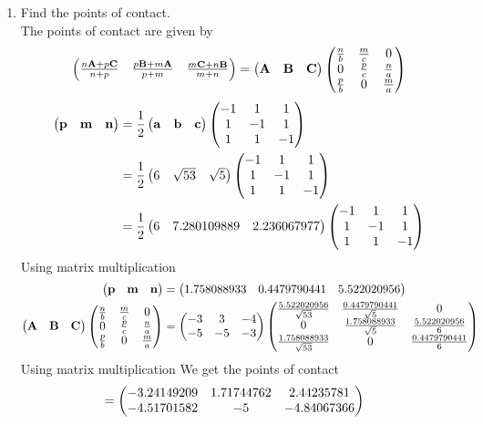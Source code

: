 \documentclass[11pt]{book}
\begin{document}
\begin{enumerate}[label=\thesubsection.\arabic*.,ref=\thesubsection.\theenumi]
\item Find the points of contact. \\ 
\solution The points of contact are given by 
\begin{align}
\begin{pmatrix}			\frac{n\mathbf{A}+p\mathbf{C}}{n+p}
&
\frac{p\mathbf{B}+m\mathbf{A}}{p+m}
&
\frac{m\mathbf{C}+n\mathbf{B}}{m+n}
\end{pmatrix}
= 	\begin{pmatrix}\mathbf{A} & \mathbf{B} &\mathbf{C}\end{pmatrix}\begin{pmatrix}\frac{n}{b} & \frac{m}{c} & 0\\0 & \frac{p}{c} & \frac{n}{a} \\\frac{p}{b} & 0 & \frac{m}{a}\end{pmatrix}
\end{align}
\begin{align}
    \begin{pmatrix}\mathbf{p} & \mathbf{ m} & \mathbf{n} \end{pmatrix} &=\frac{1}{2} \begin{pmatrix}\mathbf{a} & \mathbf{b} & \mathbf{c}\end{pmatrix} \begin{pmatrix} -1 & 1 & 1 \\1 & -1 & 1 \\1 & 1 & -1 \end{pmatrix} \\
   &= \frac{1}{2}\begin{pmatrix} 6&  \sqrt{53} & \sqrt{5} \end{pmatrix}\begin{pmatrix} -1 & 1 & 1 \\1 & -1 & 1 \\1 & 1 & -1 \end{pmatrix}  \\
   &= \frac{1}{2}\begin{pmatrix} 6&  7.280109889 & 2.236067977 \end{pmatrix}\begin{pmatrix} -1 & 1 & 1 \\1 & -1 & 1 \\1 & 1 & -1 \end{pmatrix}
\end{align}
Using matrix multiplication 
\begin{align}
        \begin{pmatrix}\mathbf{p} & \mathbf{ m} & \mathbf{n} \end{pmatrix} &= \begin{pmatrix} 1.758088933 &  0.4479790441& 5.522020956 \end{pmatrix}   \\
\begin{pmatrix}\mathbf{A} & \mathbf{B} &\mathbf{C}\end{pmatrix}\begin{pmatrix}\frac{n}{b} & \frac{m}{c} & 0\\0 & \frac{p}{c} & \frac{n}{a} \\\frac{p}{b} & 0 & \frac{m}{a}\end{pmatrix} 
  &= \begin{pmatrix}-3 & 3 & -4 \\ -5 & -5 & -3\end{pmatrix} \begin{pmatrix}\frac{5.522020956}{\sqrt{53}} & \frac{0.4479790441}{\sqrt{5}} & 0\\0 & \frac{1.758088933}{\sqrt{5}} & \frac{5.522020956}{6} \\\frac{1.758088933}{\sqrt{53}} & 0 & \frac{0.4479790441}{6}\end{pmatrix}
\end{align}
Using matrix multiplication We get the points of contact 
\begin{align}
    &= \begin{pmatrix} -3.24149209 & 1.71744762 & 2.44235781 \\ -4.51701582& -5 & -4.84067366 \end{pmatrix}
\end{align}

\end{enumerate}
\end{document}
